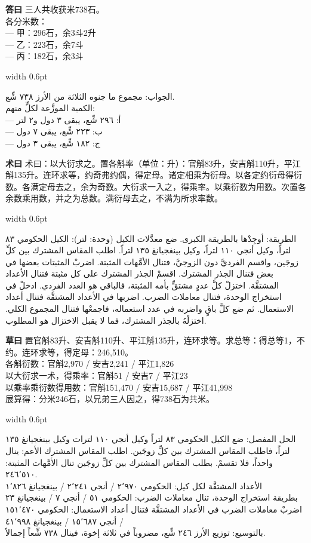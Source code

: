 \documentclass[11pt,a4paper]{article}
\newlength{\cnwidth}
\newlength{\arwidth}
\newcommand{\paralleltext}[2]{%
  \par\medskip\noindent
  \begin{minipage}[t]{\cnwidth}%
    \small #1%
  \end{minipage}%
  \hfill\textcolor{colrule}{\vrule width 0.6pt}\hfill
  \begin{minipage}[t]{\arwidth}%
    \small\arabicfont\beginR #2\endR%
  \end{minipage}%
  \par\medskip
}
\newcommand{\cnlabel}[1]{\textbf{\color{notecolor}#1}}
\newcommand{\arlabel}[1]{\arabicfontbf\color{notecolor}\beginR #1\endR}
\begin{document}
\paralleltext{%
\cnlabel{答曰} 三人共收获米738石。\\
各分米数：\\
--- 甲：296石，余3斗2升\\
--- 乙：223石，余7斗\\
--- 丙：182石，余3斗%
}{%
\arlabel{الجواب:} مجموع ما جنوه الثلاثة من الأرز ٧٣٨ شِّع.\\
الكمية الموزَّعة لكلٍّ منهم:\\
--- أ: ٢٩٦ شِّع، يبقى ٣ دول و٢ لتر\\
--- ب: ٢٢٣ شِّع، يبقى ٧ دول\\
--- ج: ١٨٢ شِّع، يبقى ٣ دول
}

\paralleltext{%
\cnlabel{术曰} 术曰：以大衍求之。置各斛率（单位：升）：官斛83升，安吉斛110升，平江斛135升。连环求等，约奇弗约偶，得定母。诸定相乘为衍母。以各定约衍母得衍数。各满定母去之，余为奇数。大衍求一入之，得乘率。以乘衍数为用数。次置各余数乘用数，并之为总数。满衍母去之，不满为所求率数。%
}{%
\arlabel{الطريقة:} أوجِدْها بالطريقة الكبرى. ضع معدَّلات الكيل (وحدة: لتر): الكيل الحكومي ٨٣ لتراً، وكيل أنجي ١١٠ لتراً، وكيل بينغجيانغ ١٣٥ لتراً. اطلب المقاس المشترك بين كلِّ زوجَين، واقسم الفرديَّ دون الزوجيَّ، فتنال الأمَّهات المثبتة. اضربْ المثبتات بعضها في بعض فتنال الجذر المشترك. اقسمْ الجذر المشترك على كل مثبتة فتنال الأعداد المشتقَّة. اختزلْ كلَّ عددٍ مشتقٍّ بأمه المثبتة، فالباقي هو العدد الفردي. ادخلْ في استخراج الوحدة، فتنال معاملات الضرب. اضربها في الأعداد المشتقَّة فتنال أعداد الاستعمال. ثم ضع كلَّ باقٍ واضربه في عدد استعماله، فاجمعْها فتنال المجموع الكلي. اختزلْهُ بالجذر المشترك، فما لا يقبل الاختزال هو المطلوب.
}

\paralleltext{%
\cnlabel{草曰} 置官斛83升、安吉斛110升、平江斛135升，连环求等。求总等：得总等1，不约。连环求等，得定母：246,510。\\
各斛衍数：官斛2,970 / 安吉2,241 / 平江1,826\\
以大衍求一术，得乘率：官斛51 / 安吉7 / 平江23\\
以乘率乘衍数得用数：官斛151,470 / 安吉15,687 / 平江41,998\\
展算得：分米246石，以兄弟三人因之，得738石为共米。%
}{%
\arlabel{الحل المفصل:} ضع الكيل الحكومي ٨٣ لتراً وكيل أنجي ١١٠ لترات وكيل بينغجيانغ ١٣٥ لتراً، فاطلب المقاس المشترك بين كلِّ زوجَين. اطلب المقاس المشترك الأعم: ينال واحداً، فلا تقسمْ. بطلب المقاس المشترك بين كلِّ زوجَين تنال الأمَّهات المثبتة: ٢٤٦٬٥١٠.\\
الأعداد المشتقَّة لكل كيل: الحكومي ٢٬٩٧٠ / أنجي ٢٬٢٤١ / بينغجيانغ ١٬٨٢٦\\
بطريقة استخراج الوحدة، تنال معاملات الضرب: الحكومي ٥١ / أنجي ٧ / بينغجيانغ ٢٣\\
اضربْ معاملات الضرب في الأعداد المشتقَّة فتنال أعداد الاستعمال: الحكومي ١٥١٬٤٧٠ / أنجي ١٥٬٦٨٧ / بينغجيانغ ٤١٬٩٩٨\\
بالتوسيع: توزيع الأرز ٢٤٦ شِّع، مضروباً في ثلاثة إخوة، فينال ٧٣٨ شِّعاً إجمالاً.
}
\end{document}
